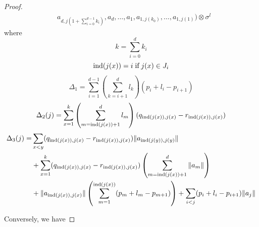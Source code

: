 \documentclass[12pt]{article}
\begin{document}
\begin{proof}
\begin{align*}
		&a_{d,j(1+\sum_{i=0}^{d-1} k_i)},a_d,\dots, a_1, a_{1,j(k_0)},\dots,a_{1,j(1)})\otimes \sigma^l 
	\end{align*} 
	where 
	\[k = \sum_{i=0}^{d} k_i\]
	\[\textup{ind}(j(x)) = i \;\textup{if}\; j(x) \in J_i\]
	\[\Delta_1 = \sum_{i=1}^{d-1} (\sum_{k=i+1}^{d} l_k) (p_i + l_i - p_{i+1}) \]
	\[\Delta_2(j) = \sum_{x=1}^{k} \left( \sum_{m=\textup{ind}(j(x))+1}^{d} l_m\right) (q_{\textup{ind}(j(x)),j(x)}-r_{\textup{ind}(j(x)),j(x)})\]
	\begin{align*}\Delta_3(j) =& \sum_{x<y} (q_{\textup{ind}(j(x)),j(x)} - r_{\textup{ind}(j(x)),j(x)}) \|a_{\textup{ind}(j(y)),j(y)}\| \\
		&+ \sum_{x=1}^{k} (q_{\textup{ind}(j(x)),j(x)} - r_{\textup{ind}(j(x)),j(x)}) \left(\sum_{m=\textup{ind}(j(x))+1}^{d} \|a_m\| \right) \\
		& + \|a_{\textup{ind}(j(x)),j(x)}\|\left(\sum_{m=1}^{\textup{ind}(j(x))} (p_m +l_m-p_{m+1})\right) + \sum_{i<j} (p_i+l_i-p_{i+1})\|a_j\| 
	\end{align*}
	
	Conversely, we have
	

\end{proof}
\end{document}
